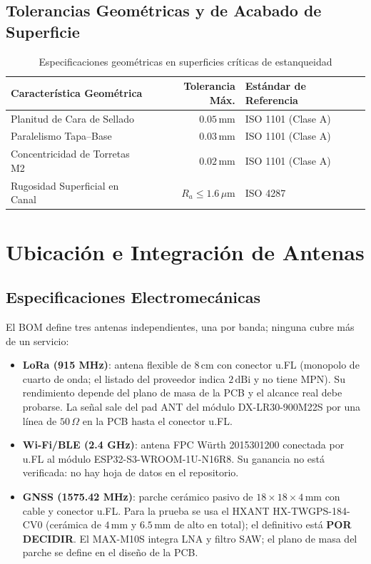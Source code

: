 \subsection{Tolerancias Geométricas y de Acabado de Superficie}

\begin{table}[H]
\centering
\caption{Especificaciones geométricas en superficies críticas de estanqueidad}
\label{tab:tolerancias_superficies}
\vspace{2mm}
\begin{tabularx}{\textwidth}{X r l}
\toprule
\rowcolor{categorybg}
\textbf{Característica Geométrica} & \textbf{Tolerancia Máx.} & \textbf{Estándar de Referencia} \\
\midrule
Planitud de Cara de Sellado & $0.05\,\text{mm}$ & ISO 1101 (Clase A) \\
\rowcolor{rowalt}
Paralelismo Tapa--Base & $0.03\,\text{mm}$ & ISO 1101 (Clase A) \\
Concentricidad de Torretas M2 & $0.02\,\text{mm}$ & ISO 1101 (Clase A) \\
\rowcolor{rowalt}
Rugosidad Superficial en Canal & $R_a \le 1.6\,\mu\text{m}$ & ISO 4287 \\
\bottomrule
\end{tabularx}
\end{table}

\section{Ubicación e Integración de Antenas}

\subsection{Especificaciones Electromecánicas}

El BOM define tres antenas independientes, una por banda; ninguna cubre más de un servicio:

\begin{itemize}[leftmargin=*]
    \item \textbf{LoRa (915 MHz)}: antena flexible de $8\,\text{cm}$ con conector u.FL (monopolo de cuarto de onda; el listado del proveedor indica $2\,\text{dBi}$ y no tiene MPN). Su rendimiento depende del plano de masa de la PCB y el alcance real debe probarse. La señal sale del pad ANT del módulo DX-LR30-900M22S por una línea de $50\,\Omega$ en la PCB hasta el conector u.FL.
    \item \textbf{Wi-Fi/BLE (2.4 GHz)}: antena FPC Würth 2015301200 conectada por u.FL al módulo ESP32-S3-WROOM-1U-N16R8. Su ganancia no está verificada: no hay hoja de datos en el repositorio.
    \item \textbf{GNSS (1575.42 MHz)}: parche cerámico pasivo de $18\times18\times4\,\text{mm}$ con cable y conector u.FL. Para la prueba se usa el HXANT HX-TWGPS-184-CV0 (cerámica de $4\,\text{mm}$ y $6.5\,\text{mm}$ de alto en total); el definitivo está \textbf{POR DECIDIR}. El MAX-M10S integra LNA y filtro SAW; el plano de masa del parche se define en el diseño de la PCB.
\end{itemize}

